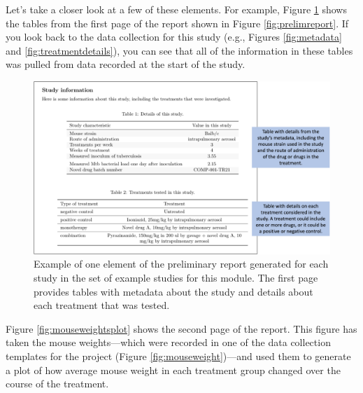 \documentclass[]{tufte-book}
\begin{document}
Let's take a closer look at a few of these elements. For example, Figure
\ref{fig:studytable} shows the tables from the first page of the report shown
in Figure \ref{fig:prelimreport}. If you look back to the data collection for
this study (e.g., Figures \ref{fig:metadata} and \ref{fig:treatmentdetails}),
you can see that all of the information in these tables was pulled from data
recorded at the start of the study.

\begin{figure}
\includegraphics[width=\textwidth]{figures/project_study_info_table} \caption[Example of one element of the preliminary report generated for each study in the set of example studies for this module]{Example of one element of the preliminary report generated for each study in the set of example studies for this module. The first page provides tables with metadata about the study and details about each treatment that was tested.}\label{fig:studytable}
\end{figure}

Figure \ref{fig:mouseweightsplot} shows the second page of the report. This
figure has taken the mouse weights---which were recorded in one of the data
collection templates for the project (Figure \ref{fig:mouseweight})---and used
them to generate a plot of how average mouse weight in each treatment group
changed over the course of the treatment.
\end{document}
